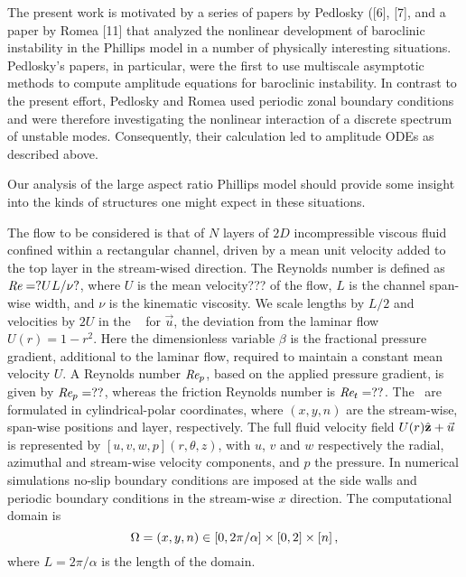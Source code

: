 The present work is motivated by a series of papers
by Pedlosky ([6], [7], and a paper by Romea [11] that analyzed the
nonlinear development of baroclinic instability in the Phillips model in
a number of physically interesting situations. Pedlosky's papers, in
particular, were the first to use multiscale asymptotic methods to
compute amplitude equations for baroclinic instability. In contrast to
the present effort, Pedlosky and Romea used periodic zonal boundary
conditions and were therefore investigating the nonlinear interaction of
a discrete spectrum of unstable modes. Consequently, their calculation
led to amplitude ODEs as described above.

Our
analysis of the large aspect ratio Phillips model should provide some
insight into the kinds of structures one might expect in these
situations.


The flow to be considered is that of $N$ layers of $2D$ incompressible
viscous fluid confined within a rectangular channel, driven by a mean
unit velocity added to the top layer in the stream-wised direction.  The
Reynolds number is defined as $\textit{Re} = ?U L / \nu?$, where $U$ is the
mean velocity??? of the flow, $L$ is the channel span-wise width, and
$\nu$ is the kinematic viscosity. We scale lengths by $L/2$ and
velocities by $2U$ in the \NSe\   for $\vec{u}$, the
deviation from the laminar flow \eqv\ $U(r)=1-r^2$. Here the
dimensionless variable $\beta$ is the fractional pressure gradient,
additional to the laminar flow, required to maintain a constant mean
velocity $U$. A Reynolds number $\textit{Re}_p$, based on the applied
pressure gradient, is given by $\textit{Re}_p = ??$, whereas the friction
Reynolds number is $\textit{Re}_{t}=??$. The \NSe\ are formulated in
cylindrical-\-polar coordinates, where $(x, y, n)$ are the stream-wise,
span-wise positions and layer, respectively. The full fluid velocity
field $U(r)\hat{{\bf z}} + \vec{u}$ is represented by
$[u,v,w,p](r,\theta,z)$, with $u$, $v$ and $w$ respectively the radial,
azimuthal and stream-wise velocity components, and $p$ the pressure. In
numerical simulations no-slip boundary conditions are imposed at the side
walls and periodic boundary conditions in the stream-wise $x$ direction.
The computational domain is
\[
\Omega={(x,y,n) \in
  [0,2\pi/\alpha]\times[0,2]\times[n]}
\,,
\] where
$L=2\pi/\alpha$ is the length of the domain.

